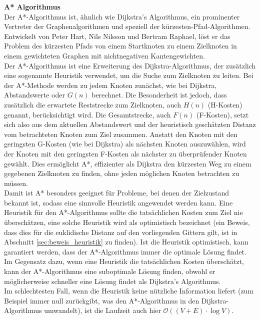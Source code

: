 \textbf{A* Algorithmus}\\
Der A*-Algorithmus ist, ähnlich wie Dijkstra's Algorithmus, ein prominenter Vertreter der Graphenalgorithmen und speziell
der kürzesten-Pfad-Algorithmen.
Entwickelt von Peter Hart, Nils Nilsson und Bertram Raphael, löst er das Problem des kürzesten Pfads von einem Startknoten
zu einem Zielknoten in einem gewichteten Graphen mit nichtnegativen Kantengewichten. \cite{hart1968}\\
Der A*-Algorithmus ist eine Erweiterung des Dijkstra-Algorithmus, der zusätzlich eine sogenannte Heuristik verwendet,
um die Suche zum Zielknoten zu leiten.
Bei der A*-Methode werden zu jedem Knoten zunächst, wie bei Dijkstra, Abstandswerte oder $G(n)$ berechnet.
Die Besonderheit ist jedoch, dass zusätzlich die erwartete Reststrecke zum Zielknoten, auch $H(n)$ (H-Kosten) genannt, berücksichtigt wird.
Die Gesamtstrecke, auch $F(n)$ (F-Kosten), setzt sich also aus dem aktuellen Abstandswert und der heuristisch geschätzten
Distanz vom betrachteten Knoten zum Ziel zusammen.
Anstatt den Knoten mit den geringsten G-Kosten (wie bei Dijkstra) als nächsten Knoten auszuwählen, wird der
Knoten mit den geringsten F-Kosten als nächster zu überprüfender Knoten gewählt.
Dies ermöglicht A*, effizienter als Dijkstra den kürzesten Weg zu einem gegebenen Zielknoten zu finden, ohne jeden
möglichen Knoten betrachten zu müssen.\\
Damit ist A* besonders geeignet für Probleme, bei denen der Zielzustand bekannt ist, sodass eine sinnvolle Heuristik angewendet werden kann. \cite{hart1968}
Eine Heuristik für den A*-Algorithmus sollte die tatsächlichen Kosten zum Ziel nie überschätzen, eine solche Heuristik
wird als optimistisch bezeichnet (ein Beweis, dass dies für die euklidische Distanz auf den vorliegenden Gittern gilt, ist in Abschnitt \ref{sec:beweis_heuristik} zu finden).
Ist die Heuristik optimistisch, kann garantiert werden, dass der A*-Algorithmus immer die optimale Lösung findet.
Im Gegensatz dazu, wenn eine Heuristik die tatsächlichen Kosten überschätzt, kann der A*-Algorithmus eine suboptimale
Lösung finden, obwohl er möglicherweise schneller eine Lösung findet als Dijkstra's Algorithmus.\\
Im schlechtesten Fall, wenn die Heuristik keine nützliche Information liefert (zum Beispiel immer null zurückgibt, was den
A*-Algorithmus in den Dijkstra-Algorithmus umwandelt), ist die Laufzeit auch hier $\mathcal{O}((V+E)\cdot\log V)$.\\\\

